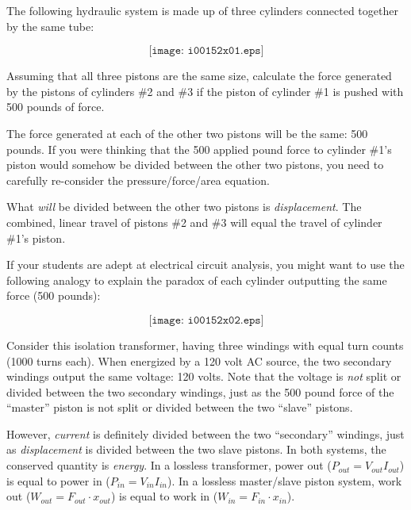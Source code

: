 

The following hydraulic system is made up of three cylinders connected together by the same tube:

$$\texttt{[image: i00152x01.eps]}$$

Assuming that all three pistons are the same size, calculate the force generated by the pistons of cylinders \#2 and \#3 if the piston of cylinder \#1 is pushed with 500 pounds of force.







The force generated at each of the other two pistons will be the same: 500 pounds.  If you were thinking that the 500 applied pound force to cylinder \#1's piston would somehow be divided between the other two pistons, you need to carefully re-consider the pressure/force/area equation.







What {\it will} be divided between the other two pistons is {\it displacement}.  The combined, linear travel of pistons \#2 and \#3  will equal the travel of cylinder \#1's piston.

\vskip 10pt

If your students are adept at electrical circuit analysis, you might want to use the following analogy to explain the paradox of each cylinder outputting the same force (500 pounds):

$$\texttt{[image: i00152x02.eps]}$$

Consider this isolation transformer, having three windings with equal turn counts (1000 turns each).  When energized by a 120 volt AC source, the two secondary windings output the same voltage: 120 volts.  Note that the voltage is {\it not} split or divided between the two secondary windings, just as the 500 pound force of the ``master'' piston is not split or divided between the two ``slave'' pistons.

However, {\it current} is definitely divided between the two ``secondary'' windings, just as {\it displacement} is divided between the two slave pistons.  In both systems, the conserved quantity is {\it energy}.  In a lossless transformer, power out ($P_{out} = V_{out} I_{out}$) is equal to power in ($P_{in} = V_{in} I_{in}$).  In a lossless master/slave piston system, work out ($W_{out} = F_{out} \cdot x_{out}$) is equal to work in ($W_{in} = F_{in} \cdot x_{in}$).




